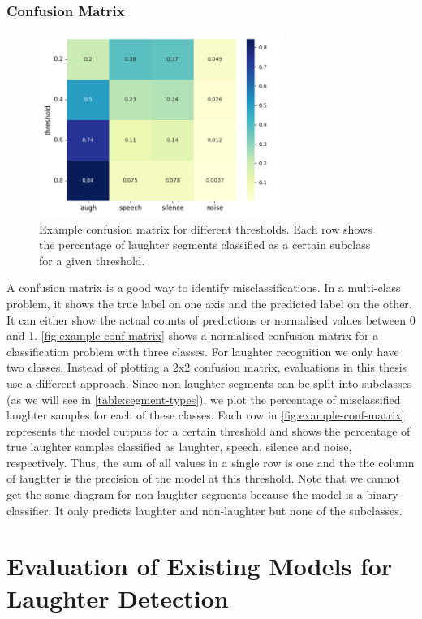 \documentclass[bsc,frontabs,parskip,deptreport]{infthesis}
\begin{document}
\subsection{Confusion Matrix} \label{sec:conf-matrix}
\begin{figure}[h!]
    \centering
    \includegraphics[width=8cm]{imgs/conf_matrix/init_eval_all.png}
    \caption{Example confusion matrix for different thresholds. Each row shows the percentage of laughter segments classified as a certain subclass for a given threshold.}
    \label{fig:example-conf-matrix}
\end{figure}
A confusion matrix is a good way to identify misclassifications. In a multi-class problem, it shows the true label on one axis and the predicted label on the other. It can either show the actual counts of predictions or normalised values between 0 and 1. \autoref{fig:example-conf-matrix} shows a normalised confusion matrix for a classification problem with three classes.
For laughter recognition we only have two classes. Instead of plotting a 2x2 confusion matrix, evaluations in this thesis use a different approach.
Since non-laughter segments can be split into subclasses (as we will see in \autoref{table:segment-types}), we plot the percentage of misclassified laughter samples for each of these classes. 
Each row in \autoref{fig:example-conf-matrix} represents the model outputs for a certain threshold and shows the percentage of true laughter samples classified as laughter, speech, silence and noise, respectively. Thus, the sum of all values in a single row is one and the the column of laughter is the precision of the model at this threshold.
Note that we cannot get the same diagram for non-laughter segments because the model is a binary classifier. It only predicts laughter and non-laughter but none of the subclasses. 


\chapter{Evaluation of Existing Models for Laughter Detection} \label{cha:model-evaluation}
\end{document}
